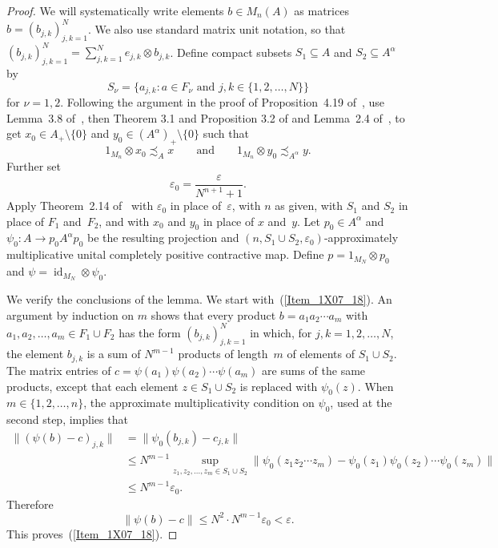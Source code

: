 \documentclass[10pt]{amsart}
\numberwithin{equation}{section}
\theoremstyle{definition}
\newcommand{\af}{\alpha}
\newcommand{\ep}{\varepsilon}
\newcommand{\ps}{\psi}
\newcommand{\id}{{\operatorname{id}}}
\newcommand{\pj}{projection}
\renewcommand{\S}{\subseteq}
\begin{document}
\begin{proof}
We will systematically write elements $b \in M_n (A)$
as matrices $b = (b_{j, k})_{j, k = 1}^N$.
We also use standard matrix unit notation, so that
$(b_{j, k})_{j, k = 1}^N = \sum_{j, k = 1}^N e_{j, k} \otimes b_{j, k}$.
Define compact subsets $S_1 \S A$ and $S_2 \S A^{\af}$ by
\[
S_{\nu} = \bigl\{ a_{j, k} \colon
 {\mbox{$a \in F_{\nu}$ and $j, k \in \{ 1, 2, \ldots, N \}$}} \bigr\}
\]
for $\nu = 1, 2$.
Following the argument in the proof of
Proposition~4.19 of~\cite{MohPhil2021TRP}, use Lemma~3.8 of~\cite{PhlT1},
then Theorem 3.1 and Proposition 3.2 of \cite{MohPhil2021TRP}
and Lemma~2.4 of~\cite{Phl40},
to get $x_0 \in A_{+} \setminus \{ 0 \}$
and $y_0 \in (A^{\alpha})_{+} \setminus \{ 0 \}$ such that
%
\begin{equation}\label{Eq_6410_Multiple}
1_{M_n} \otimes x_0 \precsim_{A} x
\qquad {\mbox{and}} \qquad
1_{M_n} \otimes y_0 \precsim_{A^{\alpha}} y.
\end{equation}
%
Further set
\[
\ep_0 = \frac{\ep}{N^{n + 1} + 1}.
\]
Apply Theorem~2.14 of~\cite{MohPhil2021TRP}
with $\ep_0$ in place of~$\ep$,
with $n$ as given,
with $S_1$ and $S_2$ in place of $F_1$ and~$F_2$,
and with $x_0$ and $y_0$ in place of $x$ and~$y$.
Let $p_0 \in A^{\alpha}$ and $\ps_0 \colon A \to p_0 A^{\alpha} p_0$
be the resulting \pj{} and $(n, S_1 \cup S_2, \ep_0)$-approximately
multiplicative unital completely positive contractive map.
Define $p = 1_{M_N} \otimes p_0$ and $\ps = \id_{M_N} \otimes \psi_0$.

We verify the conclusions of the lemma.
We start with~(\ref{Item_1X07_18}).
An argument by induction on $m$ shows that every
product $b = a_1 a_2 \cdots a_m$
with $a_1, a_2, \ldots, a_m \in F_1 \cup F_2$ has the form
$(b_{j, k})_{j, k = 1}^N$ in which, for $j, k = 1, 2, \ldots, N$,
the element $b_{j, k}$ is a sum of $N^{m - 1}$ products
of length~$m$ of elements of $S_1 \cup S_2$.
The matrix entries of $c = \ps (a_1) \ps (a_2) \cdots \ps (a_m)$
are sums of the same products, except that
each element $z \in S_1 \cup S_2$ is replaced with $\ps_0 (z)$.
When $m \in \{ 1, 2, \ldots, n \}$, the approximate multiplicativity
condition on $\ps_0$, used at the second step, implies that
\[
\begin{split}
\| (\ps (b) - c)_{j, k} \|
& = \| \ps_0 (b_{j, k}) - c_{j, k} \|
\\
& \leq N^{m - 1}
   \sup_{z_1, z_2, \ldots, z_m \in S_1 \cup S_2}
      \bigl\| \ps_0 (z_1 z_2 \cdots z_m)
            - \ps_0 (z_1) \ps_0 (z_2) \cdots \ps_0 (z_m) \bigr\|
\\
& \leq N^{m - 1} \ep_0.
\end{split}
\]
Therefore
\[
\| \ps (b) - c \| \leq N^2 \cdot N^{m - 1} \ep_0 < \ep.
\]
This proves~(\ref{Item_1X07_18}).


\end{proof}
\end{document}
